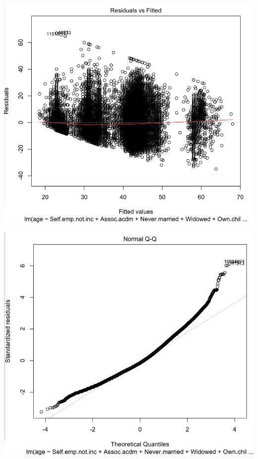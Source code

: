 \documentclass[letter]{article}
\begin{document}
 \includegraphics[scale=0.5]{ageResidCensus.png}
 
 \includegraphics[scale=0.5]{ageNormResidCensus.png}
\end{document}
